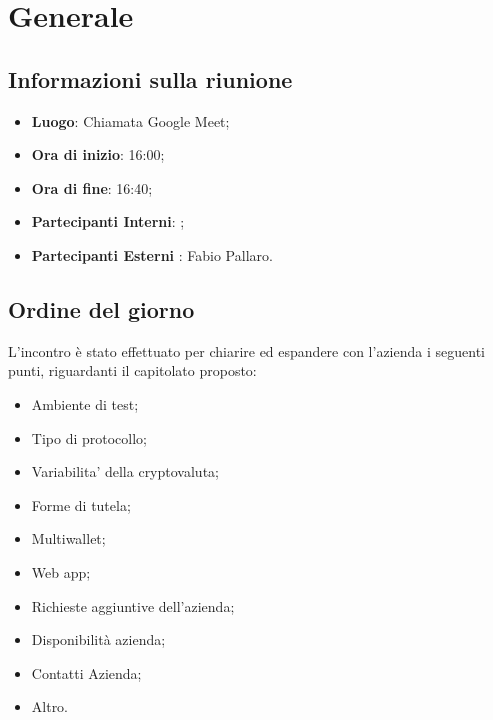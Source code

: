 \section{Generale}

\vspace{10pt}


\subsection{Informazioni sulla riunione}
\begin{itemize}
	\item \textbf{Luogo}: Chiamata Google Meet;
	\item \textbf{Ora di inizio}: 16:00;
	\item \textbf{Ora di fine}: 16:40;
	\item \textbf{Partecipanti Interni}: \team;
	\item \textbf{Partecipanti Esterni} : Fabio Pallaro.
	
\end{itemize}

\vspace{5pt}

\subsection{Ordine del giorno}
L’incontro è stato effettuato per chiarire ed espandere con l’azienda i seguenti punti, riguardanti il capitolato proposto:
\begin{itemize}
	\item Ambiente di test;
	\item Tipo di protocollo;
	\item Variabilita’ della cryptovaluta;
	\item Forme di tutela;
	\item Multiwallet;
	\item Web app;
	\item Richieste aggiuntive dell’azienda;
	\item Disponibilità azienda;
	\item Contatti Azienda;
	\item Altro.
\end{itemize}
